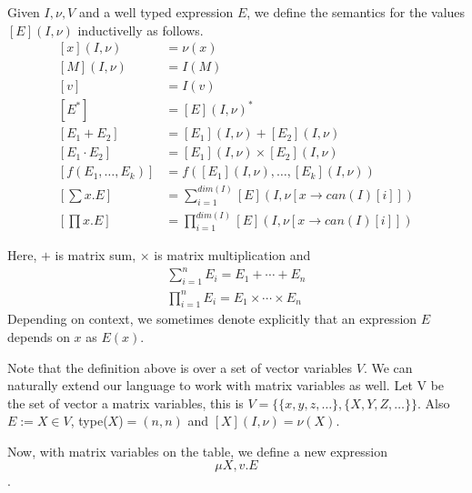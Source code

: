 Given $I, \nu, V$ and a well typed expression $E$, we define the semantics for the values $\left[ E\right](I,\nu)$ inductivelly as follows.
\begin{align*}
\left[ x\right](I,\nu)&=\nu (x)\\
\left[ M\right](I,\nu)&=I(M) \\
\left[ v\right]&=I(v) \\
\left[ E^*\right]&=\left[ E\right](I,\nu)^* \\
\left[ E_1+E_2\right]&= \left[ E_1\right](I,\nu)+\left[ E_2\right](I,\nu)\\
\left[ E_1\cdot E_2\right]&= \left[ E_1\right](I,\nu)\times \left[ E_2\right](I,\nu)\\
\left[ f(E_1,\ldots ,E_k)\right] &= f\left(\left[ E_1\right](I,\nu),\ldots , \left[  E_k\right](I,\nu)\right)\\
\left[ \sum x.E\right]&= \sum_{i=1}^{dim(I)}\left[ E\right](I, \nu [x\rightarrow can(I)[i]])\\
\left[ \prod x. E\right]&= \prod_{i=1}^{dim(I)}\left[ E\right](I, \nu [x\rightarrow can(I)[i]])
\end{align*}

Here, $+$ is matrix sum, $\times$ is matrix multiplication and 
\begin{align*}
\sum_{i=1}^n E_i = E_1+\cdots + E_n \\
\prod_{i=1}^n E_i = E_1\times \cdots\times E_n
\end{align*}
Depending on context, we sometimes denote explicitly that an expression $E$ depends on $x$ as $E(x)$.

Note that the definition above is over a set of vector variables $V$. We can naturally extend our language to work with matrix variables as well. Let V be the set of vector a matrix variables, this is $V=\lbrace\lbrace x, y, z, \ldots\rbrace,\lbrace X,Y,Z,\ldots\rbrace\rbrace$. Also $E:=X\in V$, type($X$)$=(n, n)$ and $\left[X\right](I,\nu)=\nu(X)$.

Now, with matrix variables on the table, we define a new expression $$\mu X, v.E$$.

